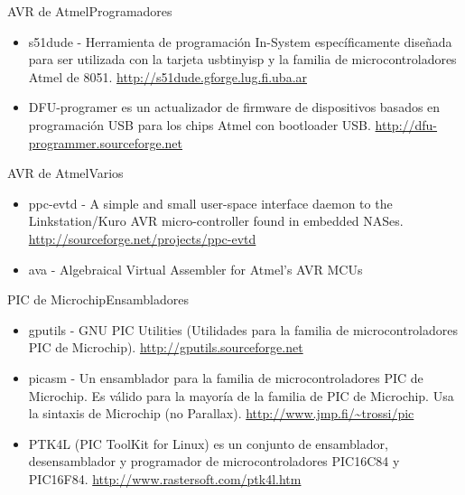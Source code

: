 \documentclass{beamer}
\begin{document}
\begin{frame}{AVR de Atmel}{Programadores}
  \begin{itemize}
  \item s51dude - Herramienta de programación In-System específicamente diseñada para ser utilizada con la tarjeta usbtinyisp y la familia de microcontroladores Atmel de 8051. \url{http://s51dude.gforge.lug.fi.uba.ar}
  \item DFU-programer es un actualizador de firmware de dispositivos basados en programación USB para los chips Atmel con bootloader USB. \url{http://dfu-programmer.sourceforge.net}
  \end{itemize}
 \end{frame}

\begin{frame}{AVR de Atmel}{Varios}
  \begin{itemize}
  \item ppc-evtd - A simple and small user-space interface daemon to the Linkstation/Kuro AVR micro-controller found in embedded NASes. \url{http://sourceforge.net/projects/ppc-evtd}
  \item ava - Algebraical Virtual Assembler for Atmel's AVR MCUs
  \end{itemize}
\end{frame}

\begin{frame}{PIC de Microchip}{Ensambladores}
  \begin{itemize}
  \item  gputils - GNU PIC Utilities (Utilidades para la familia de microcontroladores PIC de Microchip). \url{http://gputils.sourceforge.net}
  \item  picasm - Un ensamblador para la familia de microcontroladores PIC de Microchip. Es válido para la mayoría de la familia de PIC de Microchip. Usa la sintaxis de Microchip (no Parallax). \url{http://www.jmp.fi/~trossi/pic}
  \item  PTK4L (PIC ToolKit for Linux) es un conjunto de ensamblador, desensamblador y programador de microcontroladores PIC16C84 y PIC16F84. \url{http://www.rastersoft.com/ptk4l.htm}
  \end{itemize}
\end{frame}
\end{document}
